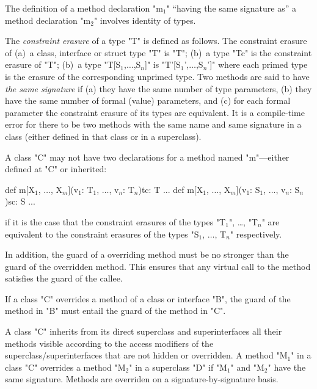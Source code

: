 The definition of a method declaration \xcdmath"m$_1$" ``having the same signature
as'' a method declaration \xcdmath"m$_2$" involves identity of types. 

The {\em constraint erasure} of a type \xcdmath"T" is defined as follows.
The constraint erasure of  (a)~a class, interface or struct type \xcdmath"T" is 
\xcdmath"T"; (b)~a type \xcdmath"T{c}" is the constraint erasure of 
\xcdmath"T"; (b)~a type \xcdmath"T[S$_1$,$\ldots$,S$_n$]" 
is \xcdmath"T'[S$_1$',$\ldots$,S$_n$']" where each primed type is the erasure of 
the corresponding unprimed type.
 Two methods are said to have {\em the
  same signature} if (a) they have the same number of type parameters,
(b) they have the same number of formal (value) parameters, and (c)
for each formal parameter the constraint erasure of its types are equivalent. It is a
compile-time error for there to be two methods with the same name and
same signature in a class (either defined in that class or in a
superclass).

\begin{staticrule*}
  A class \xcd"C" may not have two declarations for a method named \xcd"m"---either
  defined at \xcd"C" or inherited:
\begin{xtenmath}
def m[X$_1$, $\dots$, X$_m$](v$_1$: T$_1$, $\dots$, v$_n$: T$_n$){tc}: T {...}
def m[X$_1$, $\dots$, X$_m$](v$_1$: S$_1$, $\dots$, v$_n$: S$_n$){sc}: S {...}
\end{xtenmath}
\noindent
if it is the case that the constraint erasures of the types \xcdmath"T$_1$",
\dots, \xcdmath"T$_n$" are
equivalent to the constraint erasures of the types \xcdmath"S$_1$, $\dots$, T$_n$"
respectively.
\end{staticrule*}

In addition, the guard of a overriding method must be 
no stronger than the guard of the overridden method.   This
ensures that any virtual call to the method
satisfies the guard of the callee.

\begin{staticrule*}
  If a class \xcd"C" overrides a method of a class or interface
  \xcd"B", the guard of the method in \xcd"B" must entail
  the guard of the method in \xcd"C".
\end{staticrule*}

A class \xcd"C" inherits from its direct superclass and superinterfaces all
their methods visible according to the access modifiers
of the superclass/superinterfaces that are not hidden or overridden. A method \xcdmath"M$_1$" in a class
\xcd"C" overrides
a method \xcdmath"M$_2$" in a superclass \xcd"D" if
\xcdmath"M$_1$" and \xcdmath"M$_2$" have the same signature.
Methods are overriden on a signature-by-signature basis.

